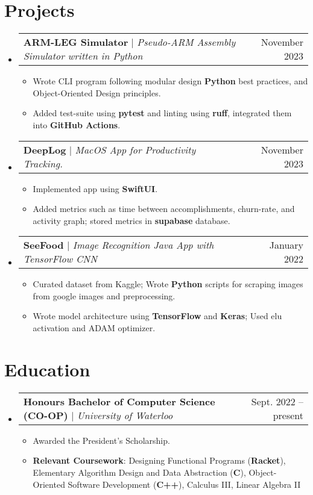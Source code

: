 \documentclass[letterpaper,11pt]{article}
\makeatletter
\newcommand{\resumeItem}[1]{
  \item\small{
    {#1 \vspace{-2pt}}
  }
}
\newcommand{\resumeProjectHeading}[2]{
    \item
    \begin{tabular*}{0.97\textwidth}{l@{\extracolsep{\fill}}r}
      \small#1 & #2 \\
    \end{tabular*}\vspace{-7pt}
}
\newcommand{\resumeSubHeadingListStart}{\begin{itemize}[leftmargin=0.15in, label={}]}
\newcommand{\resumeSubHeadingListEnd}{\end{itemize}}
\newcommand{\resumeItemListStart}{\begin{itemize}}
\newcommand{\resumeItemListEnd}{\end{itemize}\vspace{-5pt}}
\makeatother
\begin{document}
\section{Projects}
    \resumeSubHeadingListStart
            \resumeProjectHeading
          {\textbf{ARM-LEG Simulator} $|$ \emph{Pseudo-ARM Assembly Simulator written in Python}}{November 2023}
          \resumeItemListStart
                \resumeItem {Wrote CLI program following modular design \textbf{Python} best practices, and Object-Oriented Design principles.}
                \resumeItem {Added test-suite using \textbf{pytest} and linting using \textbf{ruff}, integrated them into \textbf{GitHub Actions}.}
          \resumeItemListEnd
        \resumeProjectHeading
          {\textbf{DeepLog} $|$ \emph{MacOS App for Productivity Tracking.}}{November 2023}
          \resumeItemListStart
                \resumeItem {Implemented app using \textbf{SwiftUI}.}
                \resumeItem {Added metrics such as time between accomplishments, churn-rate, and activity graph; stored metrics in \textbf{supabase} database.}
          \resumeItemListEnd
        \resumeProjectHeading
          {\textbf{SeeFood} $|$ \emph{ Image Recognition Java App with TensorFlow CNN}}{January 2022}
          \resumeItemListStart
                \resumeItem {Curated dataset from Kaggle; Wrote \textbf{Python} scripts for scraping images from google images and preprocessing.}
                \resumeItem {Wrote model architecture using \textbf{TensorFlow} and \textbf{Keras}; Used elu activation and ADAM optimizer.}
        \resumeItemListEnd
    \resumeSubHeadingListEnd


\section{Education}
  \resumeSubHeadingListStart
    \resumeProjectHeading
      {\textbf{Honours Bachelor of Computer Science (CO-OP)} $|$ \emph{University of Waterloo}}{Sept. 2022 -- present}
      \resumeItemListStart
      \resumeItem{Awarded the President's Scholarship.}
      \resumeItem{\textbf{Relevant Coursework}: Designing Functional Programs (\textbf{Racket}), Elementary Algorithm Design and Data Abstraction (\textbf{C}), Object-Oriented Software Development (\textbf{C++}), Calculus III, Linear Algebra II}
      \resumeItemListEnd
  \resumeSubHeadingListEnd
\end{document}
